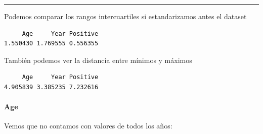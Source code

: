 \documentclass[
]{article}
\newenvironment{Shaded}{\begin{snugshade}}{\end{snugshade}}
\newcommand{\DecValTok}[1]{\textcolor[rgb]{0.00,0.00,0.81}{#1}}
\newcommand{\KeywordTok}[1]{\textcolor[rgb]{0.13,0.29,0.53}{\textbf{#1}}}
\newcommand{\NormalTok}[1]{#1}
\newcommand{\OperatorTok}[1]{\textcolor[rgb]{0.81,0.36,0.00}{\textbf{#1}}}
\newcommand{\StringTok}[1]{\textcolor[rgb]{0.31,0.60,0.02}{#1}}
\begin{document}
\begin{center}\rule{0.5\linewidth}{0.5pt}\end{center}

Podemos comparar los rangos intercuartiles si estandarizamos antes el
dataset

\begin{Shaded}
\end{Shaded}

\begin{verbatim}
     Age     Year Positive 
1.550430 1.769555 0.556355 
\end{verbatim}

También podemos ver la distancia entre mínimos y máximos

\begin{Shaded}
\end{Shaded}

\begin{verbatim}
     Age     Year Positive 
4.905839 3.385235 7.232616 
\end{verbatim}

\hypertarget{age}{%
\paragraph{Age}\label{age}}

Vemos que no contamos con valores de todos los años:

\begin{Shaded}
\end{Shaded}
\end{document}
